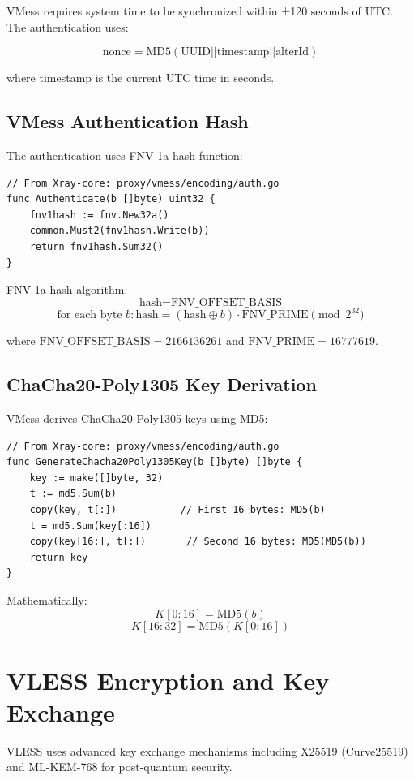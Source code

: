 VMess requires system time to be synchronized within ±120 seconds of UTC. The authentication uses:

\[
\text{nonce} = \text{MD5}(\text{UUID} || \text{timestamp} || \text{alterId})
\]

where timestamp is the current UTC time in seconds.

\subsection{VMess Authentication Hash}

The authentication uses FNV-1a hash function:

\begin{verbatim}
// From Xray-core: proxy/vmess/encoding/auth.go
func Authenticate(b []byte) uint32 {
    fnv1hash := fnv.New32a()
    common.Must2(fnv1hash.Write(b))
    return fnv1hash.Sum32()
}
\end{verbatim}

FNV-1a hash algorithm:
\[
\text{hash} = \text{FNV\_OFFSET\_BASIS}
\]
\[
\text{for each byte } b: \text{hash} = (\text{hash} \oplus b) \cdot \text{FNV\_PRIME} \pmod{2^{32}}
\]

where $\text{FNV\_OFFSET\_BASIS} = 2166136261$ and $\text{FNV\_PRIME} = 16777619$.

\subsection{ChaCha20-Poly1305 Key Derivation}

VMess derives ChaCha20-Poly1305 keys using MD5:

\begin{verbatim}
// From Xray-core: proxy/vmess/encoding/auth.go
func GenerateChacha20Poly1305Key(b []byte) []byte {
    key := make([]byte, 32)
    t := md5.Sum(b)
    copy(key, t[:])           // First 16 bytes: MD5(b)
    t = md5.Sum(key[:16])
    copy(key[16:], t[:])       // Second 16 bytes: MD5(MD5(b))
    return key
}
\end{verbatim}

Mathematically:
\[
K[0:16] = \text{MD5}(b)
\]
\[
K[16:32] = \text{MD5}(K[0:16])
\]

\section{VLESS Encryption and Key Exchange}

VLESS uses advanced key exchange mechanisms including X25519 (Curve25519) and ML-KEM-768 for post-quantum security.

